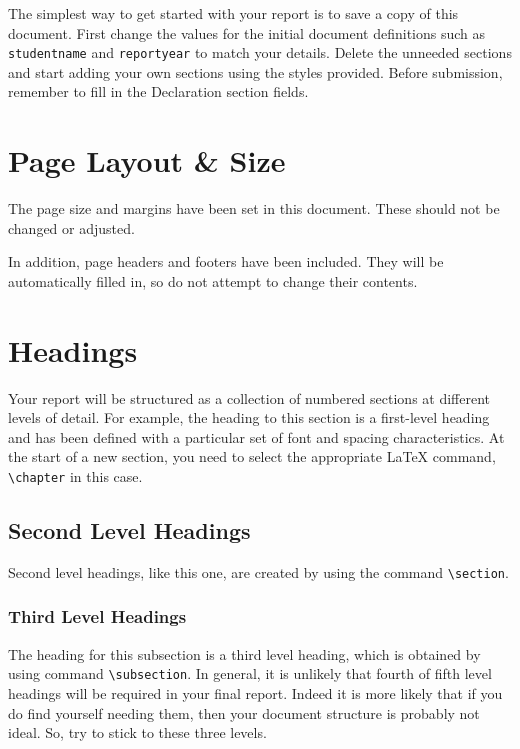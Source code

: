 \documentclass[]{final_report}
\begin{document}
The simplest way to get started with your report is to save a copy of this document. 
First change the values for the initial document definitions such as \verb|studentname| and \verb|reportyear| to match your details.
Delete the unneeded sections and start adding your own sections using the styles provided.
Before submission, remember to fill in the Declaration section fields.

\chapter{Page Layout \& Size}

The page size and margins have been set in this document. These should not be changed or adjusted. 

In addition, page headers and footers have been included. They will be automatically filled in, so do not attempt to change their contents.

\chapter{Headings}

Your report will be structured as a collection of numbered sections at different levels of detail. For example, the heading to this section is a first-level heading and has been defined with a particular set of font and spacing characteristics. At the start of a new section, you need to select the appropriate \LaTeX{} command, \verb|\chapter| in this case.
\section{Second Level Headings}
Second level headings, like this one, are created by using the command \verb|\section|.
\subsection{Third Level Headings}
The heading for this subsection is a third level heading, which is obtained by using command \verb|\subsection|. In general, it is unlikely that fourth of fifth level headings will be required in your final report. Indeed it is more likely that if you do find yourself needing them, then your document structure is probably not ideal. So, try to stick to these three levels.
\end{document}

